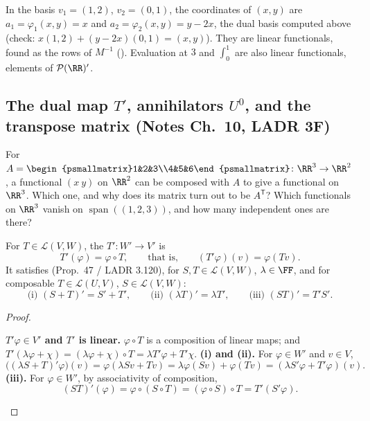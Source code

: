 \documentclass[10pt]{scrartcl}
\DeclareMathOperator{\spn}{span}\DeclareMathOperator{\nul}{null}\DeclareMathOperator{\range}{range}
\newcommand{\PP}{\mathcal P}\newcommand{\LL}{\mathcal L}\newcommand{\MM}{\mathcal M}\newcommand{\T}{\mathsf T}
\begin{document}
\revisit In the basis $v_1=(1,2)$, $v_2=(0,1)$, the coordinates of $(x,y)$ are $a_1=\varphi_1(x,y)=x$ and $a_2=\varphi_2(x,y)=y-2x$, the dual basis computed above (check: $x(1,2)+(y-2x)(0,1)=(x,y)$). They are linear functionals, found as the rows of $M^{-1}$ (). Evaluation at $3$ and $\int_0^1$ are also linear functionals, elements of $\PP(\RR)'$.

\subsection{The dual map $T'$, annihilators $U^0$, and the transpose matrix (Notes Ch.~10, LADR 3F)}

\begin{qbox}
  For $A=\begin{psmallmatrix}1&2&3\\4&5&6\end{psmallmatrix}\colon\RR^3\to\RR^2$, a functional $(x\ y)$ on $\RR^2$ can be composed with $A$ to give a functional on $\RR^3$. Which one, and why does its matrix turn out to be $A^{\T}$? Which functionals on $\RR^3$ vanish on $\spn((1,2,3))$, and how many independent ones are there?
\end{qbox}

\begin{definition*}
  For $T\in\LL(V,W)$, the  $T'\colon W'\to V'$ is
  \[
    T'(\varphi) = \varphi\circ T, \qquad\text{that is,}\qquad (T'\varphi)(v) = \varphi(Tv).
  \]
  It satisfies (Prop.~47 / LADR 3.120), for $S,T\in\LL(V,W)$, $\lambda\in\FF$, and for composable $T\in\LL(U,V)$, $S\in\LL(V,W)$:
  \[
    \text{(i) } (S+T)' = S' + T', \qquad
    \text{(ii) } (\lambda T)' = \lambda T', \qquad
    \text{(iii) } (ST)' = T'S'.
  \]
\end{definition*}
\begin{proof}
  \begin{steps}
    \ii \textbf{$T'\varphi\in V'$ and $T'$ is linear.} $\varphi\circ T$ is a composition of linear maps; and $T'(\lambda\varphi+\chi)=(\lambda\varphi+\chi)\circ T=\lambda T'\varphi+T'\chi$.
    \ii \textbf{(i) and (ii).} For $\varphi\in W'$ and $v\in V$,
    \[
      \big((\lambda S+T)'\varphi\big)(v)=\varphi(\lambda Sv+Tv)=\lambda\varphi(Sv)+\varphi(Tv)=(\lambda S'\varphi+T'\varphi)(v).
    \]
    \ii \textbf{(iii).} For $\varphi\in W'$, by associativity of composition,
    \[
      (ST)'(\varphi)=\varphi\circ(S\circ T)=(\varphi\circ S)\circ T=T'(S'\varphi).
    \]
  \end{steps}
\end{proof}
\end{document}
